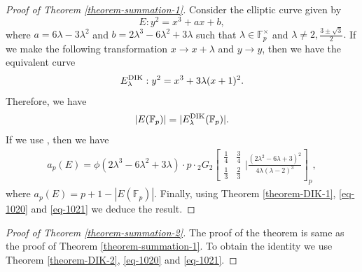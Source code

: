 \documentclass[12pt]{amsart}
\theoremstyle{plain}
\theoremstyle{definition}
\theoremstyle{remark}
\newcommand{\F}{\mathbb{F}}
\newcommand{\dik}{\text{{\rm{DIK}}}}
\numberwithin{equation}{section}
\begin{document}
\begin{proof}[Proof of Theorem \ref{theorem-summation-1}]
Consider the elliptic curve given by $$E: y^2=x^3+ax+b,$$ where $a=6\lambda-3\lambda^2$ and $b=2\lambda^3-6\lambda^2+3\lambda$ such that $\lambda\in\F_p^{\times}$ and $\lambda\neq2,\frac{3\pm\sqrt{3}}{2}.$ If we make the following transformation $x\rightarrow x+\lambda$ and $y\rightarrow y$, then we have the equivalent curve $$  E^{\dik}_{\lambda} : y^2 = x^3 + 3\lambda(x + 1)^2 .$$ Therefore, we have 
\begin{align}\label{eq-1021}
|E(\F_p)|=| E^{\dik}_{\lambda}(\F_p)|.
\end{align} If we use \cite[Theorem 1.2]{McCarthyPJM}, then we have 
\begin{align}\label{eq-1020}
a_p(E)=\phi(2\lambda^3-6\lambda^2+3\lambda)\cdot p\cdot {_2G_2}\left[\begin{array}{cc}
  \frac{1}{4}   & \frac{3}{4}  \\
  \frac{1}{3}    & \frac{2}{3}  \end{array}|\frac{(2\lambda^2-6\lambda+3)^2}{4\lambda(\lambda-2)^3}\right]_p,
\end{align}
where $a_p(E)=p+1-|E(\F_p)|.$ Finally, using Theorem \ref{theorem-DIK-1}, \eqref{eq-1020} and \eqref{eq-1021} we deduce the result.
\end{proof}

\begin{proof}[Proof of Theorem \ref{theorem-summation-2}]
The proof of the theorem is same as the proof of Theorem \ref{theorem-summation-1}. To obtain the identity we use Theorem \ref{theorem-DIK-2}, \eqref{eq-1020} and \eqref{eq-1021}.

\end{proof}
\end{document}
